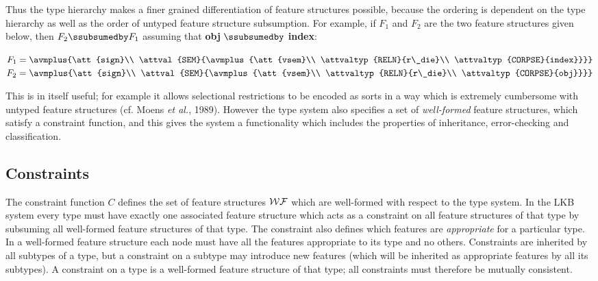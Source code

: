 \documentclass[12pt]{report}
\begin{document}
Thus the type hierarchy makes a finer grained differentiation of 
feature structures possible, because the ordering is dependent on the
type hierarchy as well as the order of untyped 
feature structure subsumption. 
For example, if $F_{1}$ and $F_{2}$ are the two feature structures given
below, then $F_{2} \ssubsumedby F_{1}$ assuming that {\bf obj}
$\ssubsumedby$ {\bf index}:
\begin{center}
{\tiny
$F_{1}=\avmplus{\att{sign}\\
             \attval{SEM}{\avmplus{\att{vsem}\\
                                   \attvaltyp{RELN}{r\_die}\\
                                   \attvaltyp{CORPSE}{index}}}}$
$F_{2}=\avmplus{\att{sign}\\
             \attval{SEM}{\avmplus{\att{vsem}\\
                                   \attvaltyp{RELN}{r\_die}\\
                                   \attvaltyp{CORPSE}{obj}}}}$

}
\end{center}
This is in itself 
useful; for example it allows selectional restrictions to be encoded as 
sorts in a way which is extremely cumbersome with untyped feature
structures
(cf. Moens {\it et al.}, 1989).
However the type system also specifies a set of
{\em well-formed} feature structures, which 
satisfy a constraint function, and this gives the system a functionality
which includes the properties of inheritance, error-checking and 
classification.

\subsection{Constraints}
\label{formcons}

The constraint function $C$ defines the set of feature structures ${\cal WF}$
which are well-formed with respect to the type system.
In the LKB system every type must have exactly one associated
feature structure which acts as a constraint on all feature structures
of that type by subsuming all well-formed feature structures of that
type.  The constraint also defines which features are {\em
appropriate} for a particular type. In a well-formed feature structure 
each node must have
all the features appropriate to its type and no others.  Constraints 
are inherited by
all subtypes of a type, but a constraint on a 
subtype may introduce new features
(which will be inherited as appropriate features by all its subtypes).
A constraint on a type is a well-formed feature structure of that
type; all constraints must therefore be mutually consistent.
\end{document}
